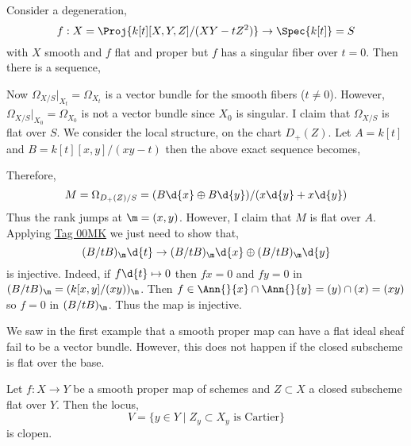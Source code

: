 \documentclass[12pt]{article}
\begin{document}
\begin{example}
Consider a degeneration, 
\[ f : X = \Proj{k[t][X,Y,Z]/(XY - t Z^2)} \to \Spec{k[t]} = S \]
with $X$ smooth and $f$ flat and proper but $f$ has a singular fiber over $t = 0$. Then there is a sequence,
\begin{center}
\end{center}
Now $\Omega_{X/S} |_{X_t} = \Omega_{X_t}$ is a vector bundle for the smooth fibers ($t \neq 0$). However, $\Omega_{X/S}|_{X_0} = \Omega_{X_0}$ is not a vector bundle since $X_0$ is singular. I claim that $\Omega_{X/S}$ is flat over $S$. We consider the local structure, on the chart $D_+(Z)$. Let $A = k[t]$ and $B = k[t][x,y]/(xy - t)$ then the above exact sequence becomes,
\begin{center}
\end{center}
Therefore,
\[ M = \Omega_{D_+(Z)/S} = (B \d{x} \oplus B \d{y})/(x \d{y} + x \d{y}) \]
Thus the rank jumps at $\m = (x,y)$. However, I claim that $M$ is flat over $A$. Applying \href{https://stacks.math.columbia.edu/tag/00MK}{Tag 00MK} we just need to show that,
\[ (B / t B)_{\m} \d{t} \to (B / t B)_\m \d{x} \oplus  (B / t B)_\m \d{y}  \]
is injective. Indeed, if $f \d{t} \mapsto 0$ then $fx = 0$ and $fy = 0$ in $(B / t B)_\m = (k[x,y]/(xy))_{\m}$. Then $f \in \Ann{}{x} \cap \Ann{}{y} = (y) \cap (x) = (xy)$ so $f = 0$ in $(B / t B)_\m$. Thus the map is injective.
\end{example}

\begin{rmk}
We saw in the first example that a smooth proper map can have a flat ideal sheaf fail to be a vector bundle. However, this does not happen if the closed subscheme is flat over the base.
\end{rmk}

\begin{prop}
Let $f : X \to Y$ be a smooth proper map of schemes and $Z \subset X$ a closed subscheme flat over $Y$. Then the locus,
\[ V = \{ y \in Y \mid Z_y \subset X_y \text{ is Cartier} \} \]
is clopen.
\end{prop}
\end{document}
